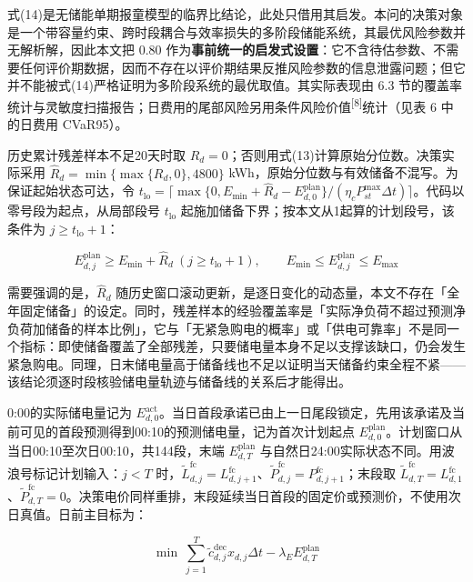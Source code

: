 \documentclass[12pt,a4paper]{ctexart}
\begin{document}
式(14)是无储能单期报童模型的临界比结论，此处只借用其启发。本问的决策对象是一个带容量约束、跨时段耦合与效率损失的多阶段储能系统，其最优风险参数并无解析解，因此本文把 0.80 作为\textbf{事前统一的启发式设置}：它不含待估参数、不需要任何评价期数据，因而不存在以评价期结果反推风险参数的信息泄露问题；但它并不能被式(14)严格证明为多阶段系统的最优取值。其实际表现由 6.3 节的覆盖率统计与灵敏度扫描报告；日费用的尾部风险另用条件风险价值\textsuperscript{[8]}统计（见表 6 中的日费用 CVaR95）。

历史累计残差样本不足20天时取 $R_d=0$；否则用式(13)计算原始分位数。决策实际采用 $\widehat R_d=\min\{\max\{R_d,0\},4800\}$ kWh，原始分位数与有效储备不混写。为保证起始状态可达，令 $t_{\mathrm{lo}}=\lceil\max\{0,E_{\min}+\widehat R_d-E_{d,0}^{\mathrm{plan}}\}/(\eta_c P_{st}^{\max}\Delta t)\rceil$。代码以零号段为起点，从局部段号 $t_{\mathrm{lo}}$ 起施加储备下界；按本文从1起算的计划段号，该条件为 $j\ge t_{\mathrm{lo}}+1$：

\begin{equation}
E_{d,j}^{\mathrm{plan}}\ge E_{\min}+\widehat R_d\ (j\ge t_{\mathrm{lo}}+1),\qquad E_{\min}\le E_{d,j}^{\mathrm{plan}}\le E_{\max}
\end{equation}

需要强调的是，$\widehat{R}_d$ 随历史窗口滚动更新，是逐日变化的动态量，本文不存在「全年固定储备」的设定。同时，残差样本的经验覆盖率是「实际净负荷不超过预测净负荷加储备的样本比例」，它与「无紧急购电的概率」或「供电可靠率」不是同一个指标：即使储备覆盖了全部残差，只要储电量本身不足以支撑该缺口，仍会发生紧急购电。同理，日末储电量高于储备线也不足以证明当天储备约束全程不紧——该结论须逐时段核验储电量轨迹与储备线的关系后才能得出。

0:00的实际储电量记为 $E_{d,0}^{\mathrm{act}}$。当日首段承诺已由上一日尾段锁定，先用该承诺及当前可见的首段预测得到00:10的预测储电量，记为首次计划起点 $E_{d,0}^{\mathrm{plan}}$。计划窗口从当日00:10至次日00:10，共144段，末端 $E_{d,T}^{\mathrm{plan}}$ 与自然日24:00实际状态不同。用波浪号标记计划输入：$j<T$ 时，$\widetilde L_{d,j}^{\mathrm{fc}}=L_{d,j+1}^{\mathrm{fc}}$、$\widetilde P_{d,j}^{\mathrm{fc}}=P_{d,j+1}^{\mathrm{fc}}$；末段取 $\widetilde L_{d,T}^{\mathrm{fc}}=L_{d,1}^{\mathrm{fc}}$、$\widetilde P_{d,T}^{\mathrm{fc}}=0$。决策电价同样重排，末段延续当日首段的固定价或预测价，不使用次日真值。日前主目标为：

\begin{equation}
\min\ \sum_{j=1}^{T}\widetilde c_{d,j}^{\mathrm{dec}}x_{d,j}\Delta t-\lambda_E E_{d,T}^{\mathrm{plan}}
\end{equation}
\end{document}
